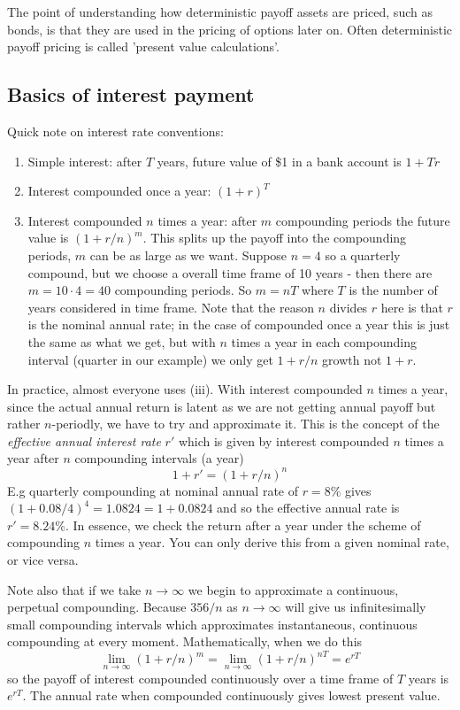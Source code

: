\documentclass[9pt]{extarticle}
\begin{document}
The point of understanding how deterministic payoff assets 
are priced, such as bonds, is that they are used in the pricing of 
options later on. Often deterministic payoff pricing is called 
'present value calculations'.
\subsection{Basics of interest payment}
Quick note on interest rate conventions:
\begin{enumerate}[label=(\roman*)]
  \item Simple interest: after $T$ years, future value of \$1 in a bank account is 
  $1+Tr$
  \item Interest compounded once a year: $(1+r)^T$
  \item Interest compounded $n$ times a year: after $m$ compounding periods the 
  future value is $(1+r/n)^m$. This splits up the payoff into the compounding periods, 
  $m$ can be as large as we want. Suppose $n=4$ so a quarterly compound, but we choose a 
  overall time frame of 10 years - then there are $m=10\cdot 4=40$ compounding 
  periods. So $m=nT$ where $T$ is the number of years considered in time frame. Note that the reason $n$ divides $r$ here is that $r$ is the nominal 
  annual rate; in the case of compounded once a year this is just the same as what we 
  get, but with $n$ times a year in each compounding interval (quarter in our example) 
  we only get $1+r/n$ growth not $1+r$.
\end{enumerate}
In practice, almost everyone uses (iii). With interest compounded $n$ times a year, 
since the actual annual return is latent as we are not getting annual payoff but rather 
$n$-periodly, we have to try and approximate it. This is the concept of 
the \textit{effective annual interest rate} $r'$ which is given by 
interest compounded $n$ times a year after $n$ compounding intervals (a year)
$$1+r' = (1+r/n)^n $$
E.g quarterly compounding at nominal annual rate of $r=8\%$ gives 
$(1+0.08/4)^4 = 1.0824 = 1+0.0824$ and so the effective annual rate 
is $r'=8.24\%$. In essence, we check the return after a year under the scheme of 
compounding $n$ times a year. You can only derive this from 
a given nominal rate, or vice versa.


Note also that if we take $n\to \infty$ 
we begin to approximate a continuous, perpetual compounding. Because $356/n$ as 
$n\to \infty$ will give us infinitesimally small compounding intervals which 
approximates instantaneous, continuous compounding at every moment. Mathematically, 
when we do this 
$$\lim_{n\to \infty} (1+r/n)^m = \lim_{n\to \infty} (1+r/n)^{nT} = e^{rT}$$
so the payoff of interest compounded continuously over a time frame of $T$ 
years is $e^{rT}$. The annual rate when compounded continuously gives 
lowest present value.
\end{document}

